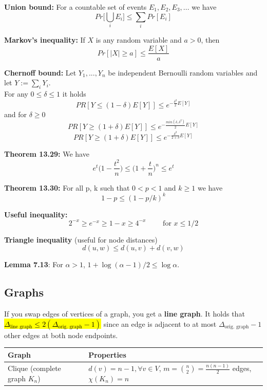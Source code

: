 \documentclass[a4paper, 8pt, landscape]{scrartcl}
\begin{document}
\begin{multicols*}{3}
\textbf{Union bound:} For a countable set of events $E_1, E_2, E_3, ...$ we have $$Pr\big[\bigcup_{i} E_i\big] \leq \sum_{i} Pr[E_i]$$

\textbf{Markov’s inequality:} If $X$ is any random variable and $a > 0$, then $$Pr[|X| \geq a] \leq \frac{E[X]}{a}$$

\textbf{Chernoff bound:} Let $Y_1, ..., Y_n$ be independent Bernoulli random variables and let $Y := \sum_{i} Y_i$.\\
For any $0 \leq \delta \leq 1$ it holds
\vspace*{-3mm}
$$PR[Y \leq (1 - \delta)E[Y]] \leq e^{-\frac{\delta^2}{2}E[Y]}$$
and for $\delta \geq 0$ 
\vspace*{-3mm}
$$PR[Y \geq (1 + \delta)E[Y]] \leq e^{-\frac{min(\delta, \delta^2)}{2}E[Y]}$$
\vspace*{-5mm}
$$PR[Y \geq (1 + \delta)E[Y]] \leq e^{-\frac{\delta^2}{2+\delta}E[Y]}$$

\textbf{Theorem 13.29:} We have $$e^t \big( 1-\frac{t^2}{n} \big) \leq \big( 1 + \frac{t}{n} \big)^n \leq e^t$$

\textbf{Theorem 13.30:} For all p, k such that $0 < p < 1$ and $k \geq 1$ we have $$1 - p \leq (1 - p/k)^k$$

\textbf{Useful inequality:} $$2^{-x} \geq e^{-x} \geq 1-x \geq 4^{-x}\qquad \text{ for } x \leq 1/2$$

\textbf{Triangle inequality} (useful for node distances) $$d(u,w) \leq d(u,v) + d(v,w)$$

\textbf{Lemma 7.13}: For $\alpha > 1$, $1 + \log(\alpha - 1)/2 \leq \log \alpha$.

\columnbreak

\subsection{Graphs}

If you swap edges of vertices of a graph, you get a \textbf{line graph}. It holds that \hl{$\Delta_{\text{line graph}} \leq 2(\Delta_{\text{orig. graph}}-1)$} since an edge is adjacent to at most $\Delta_{\text{orig. graph}}-1$ other edges at both node endpoints.

\begin{center}
\renewcommand{\arraystretch}{1.2}
\begin{tabular}{@{}p{22mm}p{50mm}@{}}
	\hline 
	Graph & Properties \\ 
	\hline
	Clique (complete graph $K_n$) & $d(v) = n-1, \forall v \in V$, $m = \binom{n}{2} = \frac{n(n-1)}{2}$ edges, $\chi(K_n) = n$ \\ 
	 

\end{tabular}
\end{center}
\end{multicols*}
\end{document}
